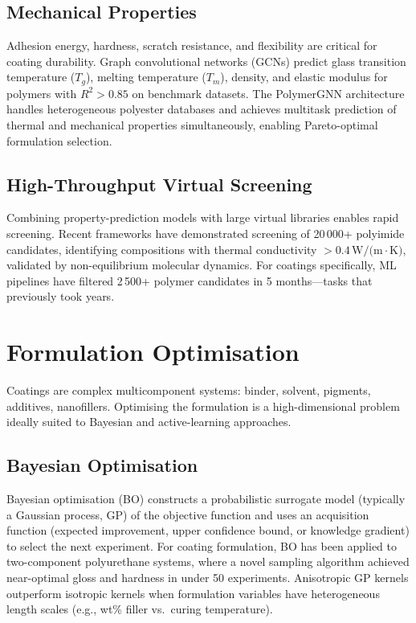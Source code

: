 \documentclass[11pt,a4paper]{article}
\begin{document}
\subsection{Mechanical Properties}

Adhesion energy, hardness, scratch resistance, and flexibility are critical for coating durability.
Graph convolutional networks (GCNs) predict glass transition temperature ($T_g$), melting temperature ($T_m$), density, and elastic modulus for polymers with $R^2 > 0.85$ on benchmark datasets.
The PolymerGNN architecture handles heterogeneous polyester databases and achieves multitask prediction of thermal and mechanical properties simultaneously, enabling Pareto-optimal formulation selection.

\subsection{High-Throughput Virtual Screening}

Combining property-prediction models with large virtual libraries enables rapid screening.
Recent frameworks have demonstrated screening of 20\,000+ polyimide candidates, identifying compositions with thermal conductivity $> 0.4\,\text{W/(m}\cdot\text{K)}$, validated by non-equilibrium molecular dynamics.
For coatings specifically, ML pipelines have filtered 2\,500+ polymer candidates in 5 months---tasks that previously took years.

\section{Formulation Optimisation}
\label{sec:formulation}

Coatings are complex multicomponent systems: binder, solvent, pigments, additives, nanofillers.
Optimising the formulation is a high-dimensional problem ideally suited to Bayesian and active-learning approaches.

\subsection{Bayesian Optimisation}

Bayesian optimisation (BO) constructs a probabilistic surrogate model (typically a Gaussian process, GP) of the objective function and uses an acquisition function (expected improvement, upper confidence bound, or knowledge gradient) to select the next experiment.
For coating formulation, BO has been applied to two-component polyurethane systems, where a novel sampling algorithm achieved near-optimal gloss and hardness in under 50 experiments.
Anisotropic GP kernels outperform isotropic kernels when formulation variables have heterogeneous length scales (e.g., wt\% filler vs.\ curing temperature).
\end{document}
